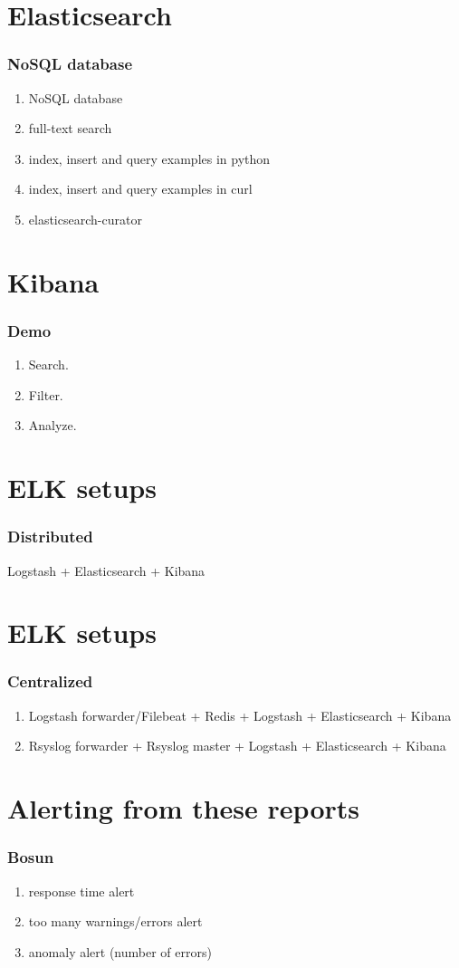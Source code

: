\documentclass[13pt, ignorenonframetext]{beamer}
\begin{document}
\section{Elasticsearch}
\begin{frame}
\frametitle{NoSQL database}
\begin{enumerate}
\item NoSQL database
\item full-text search
\item index, insert and query examples in python
\item index, insert and query examples in curl
\item elasticsearch-curator
\end{enumerate}
\end{frame}

\section{Kibana}
\begin{frame}
\frametitle{Demo}
\begin{enumerate}
\item Search.
\item Filter.
\item Analyze.
\end{enumerate}
\end{frame}

\section{ELK setups}
\begin{frame}
\frametitle{Distributed}
Logstash + Elasticsearch + Kibana
\end{frame}

\section{ELK setups}
\begin{frame}
\frametitle{Centralized}
\begin{enumerate}
    \item Logstash forwarder/Filebeat + Redis + Logstash + Elasticsearch + Kibana
    \item Rsyslog forwarder + Rsyslog master + Logstash + Elasticsearch + Kibana
\end{enumerate}
\end{frame}

\section{Alerting from these reports}
\begin{frame}
\frametitle{Bosun}
\begin{enumerate}
\item response time alert
\item too many warnings/errors alert
\item anomaly alert (number of errors)
\end{enumerate}
\end{frame}
\end{document}
